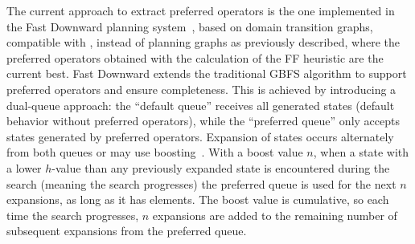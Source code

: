 \documentclass[ppgc,diss,english]{iiufrgs}
\begin{document}
The current approach to extract preferred operators is the one implemented in the Fast Downward planning system~\cite{Helmert/2009}, based on domain transition graphs, compatible with \sas, instead of planning graphs as previously described, where the preferred operators obtained with the calculation of the FF heuristic are the current best.
Fast Downward extends the traditional GBFS algorithm to support preferred operators and ensure completeness. This is achieved by introducing a dual-queue approach: the ``default queue'' receives all generated states (default behavior without preferred operators), while the ``preferred queue'' only accepts states generated by preferred operators. Expansion of states occurs alternately from both queues or may use boosting~\cite{Richter.Helmert/2009}.
With a boost value $n$, when a state with a lower $h$-value than any previously expanded state is encountered during the search (meaning the search progresses) the preferred queue is used for the next $n$ expansions, as long as it has elements. The boost value is cumulative, so each time the search progresses, $n$ expansions are added to the remaining number of subsequent expansions from the preferred queue.
\end{document}
